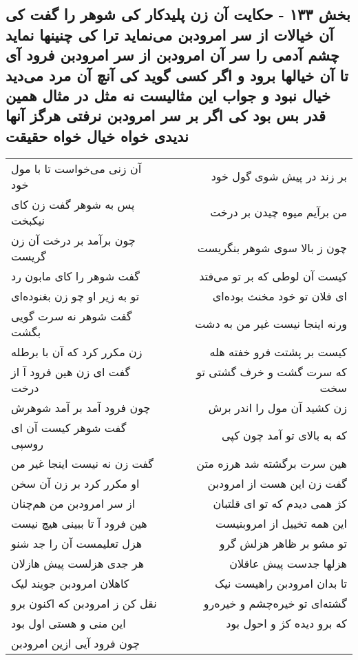 \begin{center}
\section*{بخش ۱۳۳ - حکایت آن زن پلیدکار کی شوهر را گفت کی آن خیالات از سر امرودبن می‌نماید ترا کی چنینها نماید چشم آدمی را سر آن امرودبن از سر امرودبن فرود آی تا آن خیالها برود و اگر کسی گوید کی آنچ آن مرد  می‌دید خیال نبود و جواب این مثالیست نه مثل در مثال همین  قدر بس بود کی اگر بر سر امرودبن نرفتی هرگز آنها ندیدی خواه خیال خواه حقیقت}
\label{sec:sh133}
\begin{longtable}{l p{0.5cm} r}
آن زنی می‌خواست تا با مول خود
&&
بر زند در پیش شوی گول خود
\\
پس به شوهر گفت زن کای نیکبخت
&&
من برآیم میوه چیدن بر درخت
\\
چون برآمد بر درخت آن زن گریست
&&
چون ز بالا سوی شوهر بنگریست
\\
گفت شوهر را کای مابون رد
&&
کیست آن لوطی که بر تو می‌فتد
\\
تو به زیر او چو زن بغنوده‌ای
&&
ای فلان تو خود مخنث بوده‌ای
\\
گفت شوهر نه سرت گویی بگشت
&&
ورنه اینجا نیست غیر من به دشت
\\
زن مکرر کرد که آن با برطله
&&
کیست بر پشتت فرو خفته هله
\\
گفت ای زن هین فرود آ از درخت
&&
که سرت گشت و خرف گشتی تو سخت
\\
چون فرود آمد بر آمد شوهرش
&&
زن کشید آن مول را اندر برش
\\
گفت شوهر کیست آن ای روسپی
&&
که به بالای تو آمد چون کپی
\\
گفت زن نه نیست اینجا غیر من
&&
هین سرت برگشته شد هرزه متن
\\
او مکرر کرد بر زن آن سخن
&&
گفت زن این هست از امرودبن
\\
از سر امرودبن من هم‌چنان
&&
کژ همی دیدم که تو ای قلتبان
\\
هین فرود آ تا ببینی هیچ نیست
&&
این همه تخییل از امروبنیست
\\
هزل تعلیمست آن را جد شنو
&&
تو مشو بر ظاهر هزلش گرو
\\
هر جدی هزلست پیش هازلان
&&
هزلها جدست پیش عاقلان
\\
کاهلان امرودبن جویند لیک
&&
تا بدان امرودبن راهیست نیک
\\
نقل کن ز امرودبن که اکنون برو
&&
گشته‌ای تو خیره‌چشم و خیره‌رو
\\
این منی و هستی اول بود
&&
که برو دیده کژ و احول بود
\\
چون فرود آیی ازین امرودبن

\end{longtable}
\end{center}
